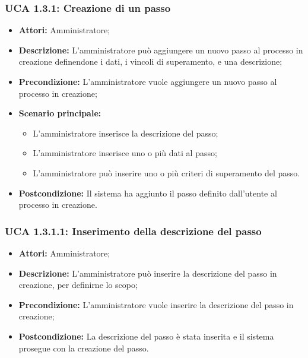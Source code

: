 \hypertarget{A1.3.1}{}
\subsubsection{UCA 1.3.1: Creazione di un passo}
\begin{itemize}
\item \textbf{Attori:}
 Amministratore;
\item \textbf{Descrizione:} 
L'amministratore può aggiungere un nuovo passo al processo in creazione definendone i dati, i vincoli di superamento, e una descrizione;
\item \textbf{Precondizione:} 
L'amministratore vuole aggiungere un nuovo passo al processo in creazione;
\item \textbf{Scenario principale:} 
\begin{itemize}
\item L'amministratore inserisce la descrizione del passo;
\item L'amministratore inserisce uno o più dati al passo;
\item L'amministratore può inserire uno o più criteri di superamento del passo.
\end{itemize}
\item \textbf{Postcondizione:}
Il sistema ha aggiunto il passo definito dall'utente al processo in creazione.
\end{itemize}

\hypertarget{A1.3.1.1}{}
\subsubsection{UCA 1.3.1.1: Inserimento della descrizione del passo}
\begin{itemize}
\item \textbf{Attori:}
 Amministratore;
\item \textbf{Descrizione:} 
L'amministratore può inserire la descrizione del passo in creazione, per definirne lo scopo;
\item \textbf{Precondizione:} 
L'amministratore vuole inserire la descrizione del passo in creazione;
\item \textbf{Postcondizione:}
 La descrizione del passo è stata inserita e il sistema prosegue con la creazione del passo.
\end{itemize}

\hypertarget{A1.3.1.2}{}
